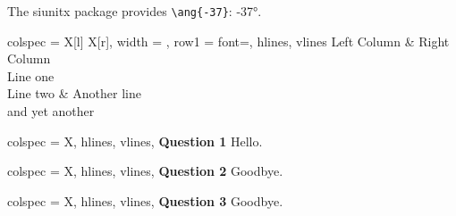 \documentclass{article}
\begin{document}
The \textsf{siunitx} package provides \verb|\ang{-37}|: \ang{-37}.

\begin{tblr}{
  colspec = {X[l] X[r]},
  width = \textwidth,
  row{1} = {font=\bfseries},
  hlines, vlines
}
Left Column & Right Column \\
{Line one \\ Line two} & {Another line \\ and yet another} \\
\end{tblr}


\begingroup
\begin{Question}{colspec = X, hlines, vlines, }
{\bfseries\color{blue}Question 1} \enspace Hello.
\end{Question}\par
\begin{Question}{colspec = X, hlines, vlines, }
{\bfseries\color{blue}Question 2} \enspace Goodbye.
\end{Question}
\begin{Question}{colspec = X, hlines, vlines, }
{\bfseries\color{blue}Question 3} \enspace Goodbye.
\end{Question}
\endgroup

%
%
%
%
\end{document}
